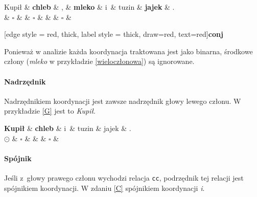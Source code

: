 \begin{exe}
\ex \label{wieloczłonowa}
\begin{dependency}[baseline=0.9ex]
\begin{deptext}[column sep=1em,  row sep=.1ex]
Kupił \& \textbf{chleb} \& , \& \textbf{mleko} \& i~\& tuzin \& \textbf{jajek} \& .  \\ 
 \& \textbf{$\square$} \& \& \textbf{$\square$} \& \& \& \textbf{$\square$} \& \\ 
\end{deptext}
[edge style = {red, thick}, label style = {thick, draw=red, text=red}]{\textbf{conj}}
\end{dependency}
\end{exe}

Ponieważ w analizie każda koordynacja traktowana jest jako binarna, środkowe człony (\textit{mleko} w przykładzie \eqref{wieloczłonowa}) są ignorowane.


\paragraph{Nadrzędnik}

Nadrzędnikiem koordynacji jest zawsze nadrzędnik głowy lewego członu. W przykładzie \eqref{G} jest to \textit{Kupił}.

\begin{exe}
\ex \label{G}
\begin{dependency}[baseline=0.9ex]
\begin{deptext}[column sep=1em, row sep=.1ex]
\textbf{Kupił} \& \textbf{chleb} \& i~\& tuzin \& jajek \& .  \\ 
\textbf{$\odot$} \& $\square$ \& \& \& $\square$ \& \\ 
\end{deptext}
\end{dependency}
\end{exe}

\paragraph{Spójnik}

Jeśli z~głowy prawego członu  wychodzi relacja \texttt{cc}, podrzędnik tej relacji jest spójnikiem koordynacji. W zdaniu \eqref{C} spójnikiem koordynacji \textit{i}.

